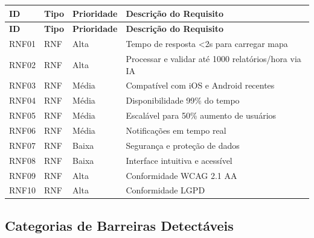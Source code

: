\documentclass[12pt,a4paper]{article}
\begin{document}
\begin{longtable}{|>{\raggedright\arraybackslash}p{1.4cm}|>{\raggedright\arraybackslash}p{1.1cm}|>{\centering\arraybackslash}p{2.4cm}|>{\raggedright\arraybackslash}p{6.8cm}|}
\hline
\textbf{ID} & \textbf{Tipo} & \textbf{Prioridade} & \textbf{Descrição do Requisito} \\
\hline
\endfirsthead

\hline
\textbf{ID} & \textbf{Tipo} & \textbf{Prioridade} & \textbf{Descrição do Requisito} \\
\hline
\endhead

RNF01 & RNF & Alta & Tempo de resposta \textless{}2s para carregar mapa \\
\hline
RNF02 & RNF & Alta & Processar e validar até 1000 relatórios/hora via IA \\
\hline
RNF03 & RNF & Média & Compatível com iOS e Android recentes \\
\hline
RNF04 & RNF & Média & Disponibilidade 99\% do tempo \\
\hline
RNF05 & RNF & Média & Escalável para 50\% aumento de usuários \\
\hline
RNF06 & RNF & Média & Notificações em tempo real \\
\hline
RNF07 & RNF & Baixa & Segurança e proteção de dados \\
\hline
RNF08 & RNF & Baixa & Interface intuitiva e acessível \\
\hline
RNF09 & RNF & Alta & Conformidade WCAG 2.1 AA \\
\hline
RNF10 & RNF & Alta & Conformidade LGPD \\
\hline
\end{longtable}

\subsection{Categorias de Barreiras Detectáveis}
\end{document}
